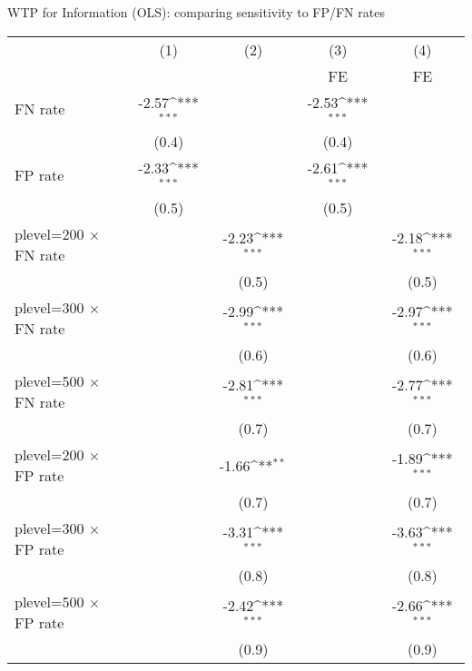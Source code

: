 \def\sym#1{\ifmmode^{#1}\else\(^{#1}\)\fi}
\caption{WTP for Information (OLS): comparing sensitivity to FP/FN rates}
\begin{tabular}{l*{4}{c}}
\hline\hline
                &\multicolumn{1}{c}{(1)}&\multicolumn{1}{c}{(2)}&\multicolumn{1}{c}{(3)}&\multicolumn{1}{c}{(4)}\\
                &\multicolumn{1}{c}{}&\multicolumn{1}{c}{}&\multicolumn{1}{c}{FE}&\multicolumn{1}{c}{FE}\\
\hline
FN rate         &    -2.57\sym{***}&                  &    -2.53\sym{***}&                  \\
                &    (0.4)         &                  &    (0.4)         &                  \\
FP rate         &    -2.33\sym{***}&                  &    -2.61\sym{***}&                  \\
                &    (0.5)         &                  &    (0.5)         &                  \\
plevel=200 $\times$ FN rate&                  &    -2.23\sym{***}&                  &    -2.18\sym{***}\\
                &                  &    (0.5)         &                  &    (0.5)         \\
plevel=300 $\times$ FN rate&                  &    -2.99\sym{***}&                  &    -2.97\sym{***}\\
                &                  &    (0.6)         &                  &    (0.6)         \\
plevel=500 $\times$ FN rate&                  &    -2.81\sym{***}&                  &    -2.77\sym{***}\\
                &                  &    (0.7)         &                  &    (0.7)         \\
plevel=200 $\times$ FP rate&                  &    -1.66\sym{**} &                  &    -1.89\sym{***}\\
                &                  &    (0.7)         &                  &    (0.7)         \\
plevel=300 $\times$ FP rate&                  &    -3.31\sym{***}&                  &    -3.63\sym{***}\\
                &                  &    (0.8)         &                  &    (0.8)         \\
plevel=500 $\times$ FP rate&                  &    -2.42\sym{***}&                  &    -2.66\sym{***}\\
                &                  &    (0.9)         &                  &    (0.9)         \\

\end{tabular}
